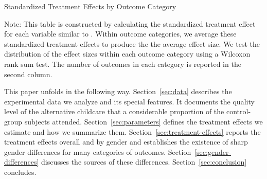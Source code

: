 \begin{table}[H]
\centering
\caption{Standardized Treatment Effects by Outcome Category}
\label{tab:stdte}
\begin{threeparttable}

\begin{tablenotes}
\footnotesize
\item Note: This table is constructed by calculating the standardized treatment effect for each variable similar to \citet{Katz_Kling_etal_2001_QJE}. Within outcome categories, we average these standardized treatment effects to produce the the average effect size. We test the distribution of the effect sizes within each outcome category using a Wilcoxon rank sum test. The number of outcomes in each category is reported in the second column. 
\end{tablenotes}
\end{threeparttable}
\end{table}

This paper unfolds in the following way. Section~\ref{sec:data} describes the experimental data we analyze and its special features. It documents the quality level of the alternative childcare that a considerable proportion of the control-group subjects attended. Section~\ref{sec:parameters} defines the treatment effects we estimate and how we summarize them. Section~\ref{sec:treatment-effects} reports the treatment effects overall and by gender and establishes the existence of sharp gender differences for many categories of outcomes. Section~\ref{sec:gender-differences} discusses the sources of these differences. Section~\ref{sec:conclusion} concludes.


